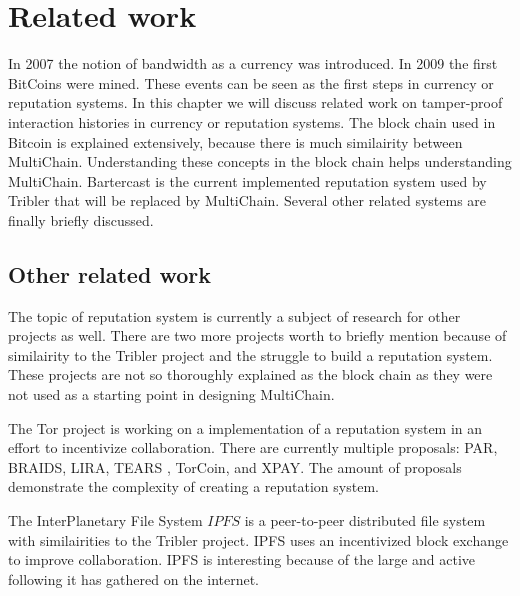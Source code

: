 \chapter{Related work}
In 2007 the notion of bandwidth as a currency was introduced.
In 2009 the first BitCoins were mined.
These events can be seen as the first steps in currency or reputation systems.
In this chapter we will discuss related work on tamper-proof interaction histories in currency or reputation systems.
The block chain used in Bitcoin is explained extensively,
because there is much similairity between MultiChain.
Understanding these concepts in the block chain helps understanding MultiChain.
Bartercast is the current implemented reputation system used by Tribler that will be replaced by MultiChain.
Several other related systems are finally briefly discussed.





\section{Other related work}
The topic of reputation system is currently a subject of research for other projects as well.
There are two more projects worth to briefly mention because of similairity to the Tribler project
and the struggle to build a reputation system.
These projects are not so thoroughly explained as the block chain
as they were not used as a starting point in designing MultiChain.

The Tor project is working on a implementation of a reputation system in an effort to incentivize collaboration\cite{dingledine-torincentive}.
There are currently multiple proposals: PAR\cite{androulaki-torincentive}, BRAIDS\cite{jansen-braid}, LIRA\cite{jansen-lira}, TEARS \cite{jansen-torincentive}, TorCoin\cite{ghosh-torincentive}, and XPAY\cite{chen-torincentive}.
The amount of proposals demonstrate the complexity of creating a reputation system.

The InterPlanetary File System \(IPFS\) is a peer-to-peer distributed file system with similairities to the Tribler project.
IPFS uses an incentivized block exchange to improve collaboration\cite{benet-ipfs}.
IPFS is interesting because of the large and active following it has gathered on the internet.